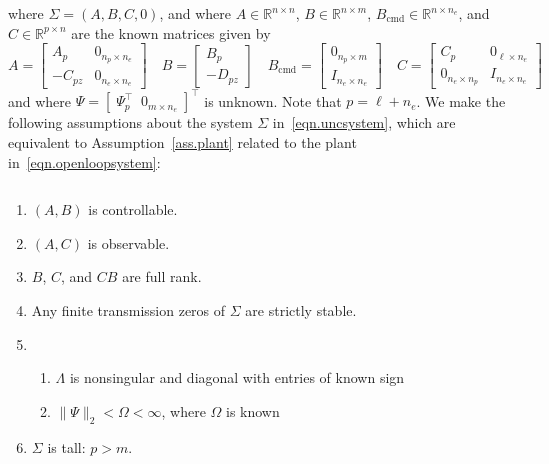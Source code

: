 \documentclass[]{../sty/aiaa-tc}
\begin{document}
  where $\Sigma=(A,B,C,0)$, and where $A\in\mathbb{R}^{n\times n}$, $B\in\mathbb{R}^{n\times m}$, $B_{\text{cmd}}\in\mathbb{R}^{n\times n_{e}}$, and $C\in\mathbb{R}^{p\times n}$ are the known matrices given by
  \begin{equation*}
    A=
    \begin{bmatrix}
      A_{p} & 0_{n_{p}\times n_{e}} \\
      -C_{pz} & 0_{n_{e}\times n_{e}}
    \end{bmatrix} \quad
    B=
    \begin{bmatrix}
      B_{p} \\
      -D_{pz}
    \end{bmatrix}
    \quad
    B_{\text{cmd}}=
    \begin{bmatrix}
      0_{n_{p}\times m} \\
      I_{n_{e}\times n_{e}}
    \end{bmatrix}
    \quad
    C=
    \begin{bmatrix}
      C_{p} & 0_{\ell\times n_{e}} \\
      0_{n_{e}\times n_{p}} & I_{n_{e}\times n_{e}}
    \end{bmatrix}
  \end{equation*}
  and where $\Psi=[\;\Psi_{p}^{\top}\;\;0_{m\times n_{e}}\;]^{\top}$ is unknown.
  Note that $p=\ell+n_{e}$.
  We make the following assumptions about the system $\Sigma$ in\ \eqref{eqn.uncsystem}, which are equivalent to Assumption~\ref{ass.plant} related to the plant in\ \eqref{eqn.openloopsystem}:

  \begin{ass-dan} $\;$\label{ass.uncsystem}
    \begin{enumerate}[\alph{enumi}), ref=\alph{enumi}] %
      \itemsep0em
      \item{$(A,B)$ is controllable.\label{ass.cont}}
      \item{$(A,C)$ is observable.\label{ass.obsv}}
      \item{$B$, $C$, and $CB$ are full rank.\label{ass.rank}}
      \item{Any finite transmission zeros of $\Sigma$ are strictly stable.\label{ass.tzero}}
      \item{%
        \begin{enumerate}[(\alph{enumii}), ref=\alph{enumii}]
        \item{$\Lambda$ is nonsingular and diagonal with entries of known sign\label{ass.unc.lambda}}
        \item{$\|\Psi\|_{2}<\Omega<\infty$, where $\Omega$ is known\label{ass.unc.w}}
        \end{enumerate}\label{ass.unc}
      }
      \item{$\Sigma$ is tall: $p>m$.\label{ass.tall}}
    \end{enumerate}
  \end{ass-dan}
\end{document}
